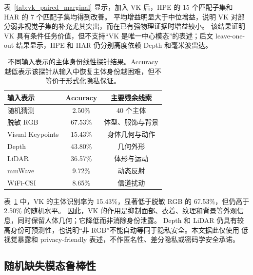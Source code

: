 \documentclass[journal]{IEEEtran}
\begin{document}
表~\ref{tab:vk_paired_marginal} 显示，加入 VK 后，HPE 的 15 个匹配子集和 HAR 的 7 个匹配子集均得到改善。
平均增益明显大于中位增益，说明 VK 对部分弱非视觉子集的补充尤其突出，而在已有强物理证据时增益较小。
该结果证明 VK 具有条件任务价值，但不支持“VK 是唯一中心模态”的表述；后文 leave-one-out 结果显示，HPE 和 HAR 仍分别高度依赖 Depth 和毫米波雷达。

\begin{table}[H]
\centering
\caption{不同输入表示的主体身份线性探针结果。Accuracy 越低表示该探针从输入中恢复主体身份越困难，但不等价于形式化隐私保证。}
\label{tab:privacy_add}
\footnotesize
\begin{tabular}{lcc}
\toprule
输入表示 & Accuracy & 主要残余线索 \\
\midrule
随机猜测 & 2.50\% & 40 个主体 \\
脱敏 RGB & 67.53\% & 体型、服饰与背景 \\
Visual Keypoints & 15.43\% & 身体几何与动作 \\
Depth & 43.80\% & 几何外形 \\
LiDAR & 36.57\% & 体形与运动 \\
mmWave & 9.72\% & 动态反射 \\
WiFi-CSI & 8.65\% & 信道扰动 \\
\bottomrule
\end{tabular}
\end{table}

表~\ref{tab:privacy_add} 中，VK 的主体识别率为 15.43\%，显著低于脱敏 RGB 的 67.53\%，但仍高于 2.50\% 的随机水平。
因此，VK 的作用是抑制面部、衣着、纹理和背景等外观信息，同时保留人体几何；它降低而非消除身份泄露。
Depth 和 LiDAR 仍具有较高身份可预测性，也说明“非 RGB”不能自动等同于隐私安全。本文据此仅使用
低视觉暴露和 privacy-friendly 表述，不作匿名性、差分隐私或密码学安全承诺。

\subsection{随机缺失模态鲁棒性}
\end{document}
